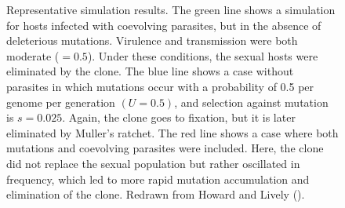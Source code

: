 \documentclass[
  letterpaper,
]{book}
\begin{document}
\begin{figure}


\caption[Representative simulation
results]{\label{fig-6-3}Representative simulation results. The green
line shows a simulation for hosts infected with coevolving parasites,
but in the absence of deleterious mutations. Virulence and transmission
were both moderate (\(= 0.5\)). Under these conditions, the sexual hosts
were eliminated by the clone. The blue line shows a case without
parasites in which mutations occur with a probability of 0.5 per genome
per generation \((U = 0.5)\), and selection against mutation is
\(s = 0.025\). Again, the clone goes to fixation, but it is later
eliminated by Muller's ratchet. The red line shows a case where both
mutations and coevolving parasites were included. Here, the clone did
not replace the sexual population but rather oscillated in frequency,
which led to more rapid mutation accumulation and elimination of the
clone. Redrawn from Howard and Lively
().}

\end{figure}%
\end{document}
